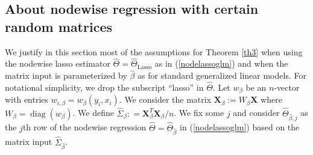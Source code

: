 \documentclass[aos,MSNbibl,dvips]{arximspdf}
\def\cal{\mathcal}
\newcommand{\bx}{\mathbf{X}}
\begin{document}

\subsection{About nodewise regression with certain random
matrices}\label{subsecnodewiserandommat}

We justify in this section most of the assumptions for Theorem
\ref{th3} when using the nodewise lasso estimator $\hat{\Theta} =
\hat{\Theta}_{\mathrm{Lasso}}$ as in (\ref{nodelassoglm})
and when\vadjust{\goodbreak} the matrix input is parameterized by $\hat{\beta}$ as for standard
generalized linear models. For notational simplicity, we drop the subscript
``lasso'' in $\hat{\Theta}$. Let
$w_{\beta} $ be an $n$-vector with entries
$w_{i, \beta} = w_{\beta} (y_i, x_i)$. We consider the
matrix $\bx_{{\beta}}:= W_{\beta} \bx$ where $W_{\beta} = \operatorname{diag}
(w_{\beta})$. We define $\hat\Sigma_{\beta}: =\bx_{\beta}^T
\bx_{{\beta} } / n $. We fix some $j$ and consider $\hat\Theta
_{\hat
\beta,j}$ as the $j$th row of
the nodewise regression $\hat{\Theta} = \hat{\Theta}_{\hat{\beta
}}$ in
(\ref{nodelassoglm}) based on the matrix input $\hat\Sigma_{\hat
\beta}$.
\end{document}

